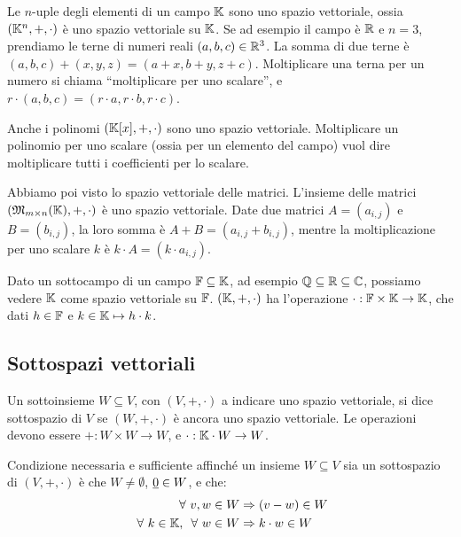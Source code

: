 Le $n$-uple degli elementi di un campo $\mathbb{K}$ sono uno spazio vettoriale, ossia $(\mathbb{K}^n, +, \cdot)$ \`e uno spazio vettoriale su $\mathbb{K}$. Se ad esempio il campo \`e $\mathbb{R}$ e $n = 3$, prendiamo le terne di numeri reali $(a,b,c) \in \mathbb{R}^3$. La somma di due terne \`e $(a,b,c) + (x,y,z) = (a + x, b + y, z + c)$. Moltiplicare una terna per un numero si chiama ``moltiplicare per uno scalare'', e $r \cdot (a,b,c) = (r \cdot a, r \cdot b, r \cdot c)$.

Anche i polinomi $(\mathbb{K}[x], +, \cdot)$ sono uno spazio vettoriale. Moltiplicare un polinomio per uno scalare (ossia per un elemento del campo) vuol dire moltiplicare tutti i coefficienti per lo scalare.

Abbiamo poi visto lo spazio vettoriale delle matrici. L'insieme delle matrici $(\mathfrak{M}_{m \times n} (\mathbb{K}), +, \cdot)$ \`e uno spazio vettoriale. Date due matrici $A = (a_{i,j})$ e $B = (b_{i,j})$, la loro somma \`e $A + B = (a_{i,j} + b_{i,j})$, mentre la moltiplicazione per uno scalare $k$ \`e $k \cdot A = (k \cdot a_{i,j})$.

Dato un sottocampo di un campo $\mathbb{F} \subseteq \mathbb{K}$, ad esempio $\mathbb{Q} \subseteq \mathbb{R} \subseteq \mathbb{C}$, possiamo vedere $\mathbb{K}$ come spazio vettoriale su $\mathbb{F}$. %
$(\mathbb{K}, +, \cdot)$ ha l'operazione $\cdot : \mathbb{F} \times \mathbb{K} \to \mathbb{K}$, che dati $h \in \mathbb{F}$ e $ k \in \mathbb{K} \mapsto h \cdot k$.

\subsection{Sottospazi vettoriali}

Un sottoinsieme $W \subseteq V$, con $(V, +, \cdot)$ a indicare uno spazio vettoriale, si dice sottospazio di $V$ se $(W, +, \cdot)$ \`e ancora uno spazio vettoriale. Le operazioni devono essere $+ : W \times W \to W$, e $\cdot : \mathbb{K} \cdot W \to W$.

Condizione necessaria e sufficiente affinch\'e un insieme $W \subseteq V$ sia un sottospazio di $(V, +, \cdot)$ \`e che $W \neq \emptyset$, $\underline{0} \in W$, e che:
\begin{align*}
\forall v, w \in W &\implies (v - w) \in W \\
\forall k \in \field , \, \forall w \in W &\implies k \cdot w \in W
\end{align*}

